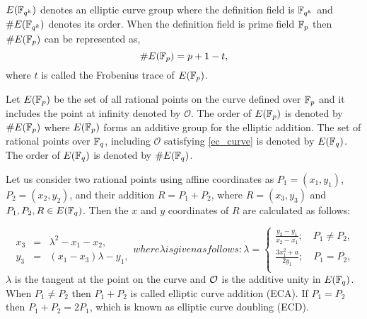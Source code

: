         $E({\mathbb{F}}_{q^{k}})$ denotes an elliptic curve group where the definition field is ${\mathbb{F}}_{q^{k}}$ and $\#E({\mathbb{F}}_{q^{k}})$ denotes its order. When the definition field is prime field ${\mathbb{F}}_{p}$ then $\#E({\mathbb{F}}_{p})$ can be represented as,
        \begin{equation}\label{order}
        \#E({\mathbb{F}}_{p}) = p+1-t,
        \end{equation} 
        where $t$ is called the Frobenius trace of $E({\mathbb{F}}_{p})$.
        
        Let $E({\mathbb{F}}_{p})$ be the set of all rational points on the curve defined over ${\mathbb{F}}_{p}$ and it includes the point at infinity denoted by $\mathcal{O}$. 
        The order of $E(\mathbb{F}_p)$ is denoted by $\#E(\mathbb{F}_p)$ where $E(\mathbb{F}_p)$ forms an additive group for the elliptic addition. The set of rational points over ${\mathbb{F}}_{q}$, including $\mathcal{O}$ satisfying \eqref{ec_curve} is denoted by $E({\mathbb{F}}_{q})$. The order of $E({\mathbb{F}}_{q})$ is denoted by $\#E({\mathbb{F}}_{q})$.
        
        Let us consider two rational points using affine coordinates as $P_1= (x_1, y_1)$, $P_2 = (x_2, y_2)$, and their addition $R = P_1 + P_2$, where $\textit{R} = (x_3, y_3)$ and $P_1, P_2, R \in E({\mathbb{F}}_{q})$. Then the $x$ and $y$ coordinates of $R$ are calculated as follows:
        
        \begin{subequations}
        \begin{eqnarray}\label{eq:point_add}
        x_3 & = & \lambda^2-x_1-x_2 ,\\
         y_3 & = &(x_1-x_3)\lambda - y_1, 
        \end{eqnarray}
        where \mbox{$\lambda$} is given as follows:
        \begin{equation}\label{eq:point_solpe}
        \textstyle \lambda = 
        \begin{cases}
         \textstyle \frac{y_2 - y_1}{ x_2 -x_1}; \quad \mbox{$P_1 \neq P_2$},\\
         \textstyle \frac{3x_1^2+a}{2y_1}; \quad  \mbox{$P_1 = P_2$},\\
        \end{cases}
        \end{equation}
        \end{subequations}
        $\lambda$ is the tangent at the point on the curve and $\cal O$ is the additive unity in $E({\mathbb{F}}_{q})$. When $P_1 \neq P_2$ then $P_1+P_2$ is called elliptic curve addition (ECA). If $P_1=P_2$ then $P_1+P_2=2P_1$, which is known as elliptic curve doubling (ECD). 
        
